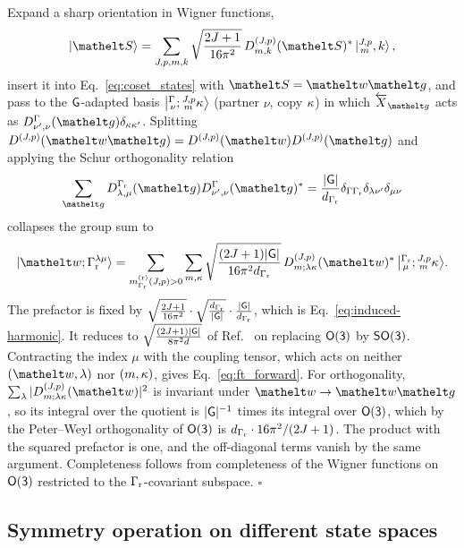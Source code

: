 Expand a sharp orientation in Wigner functions, $$\ket{\orient}=\sum_{J,\parity,m,k}\sqrt{\frac{2J+1}{16\pi^2}}\,\irrJp{J}{\parity}_{m,k}(\orient)^*\ket{{}^{J,\parity}_{\,m},k},$$ insert it into Eq.~\eqref{eq:coset_states} with $\orient=\crep\gel$, and pass to the $\mathsf{G}$-adapted basis $\bigl\lvert{}^{\Gamma}_{\,\nu};{}^{J,p}_{\,m}\kappa\bigr\rangle$ (partner $\nu$, copy $\kappa$) in which $\cev X_{\gel}$ acts as $D^{\Gamma}_{\nu',\nu}(\gel)\delta_{\mult\mult'}$. Splitting $\irrJp{J}{\parity}(\crep\gel)=\irrJp{J}{\parity}(\crep)\irrJp{J}{\parity}(\gel)$ and applying the Schur orthogonality relation $$\sum_{\gel} D^{\Grot}_{\lambda,\mu}(\gel)D^{\Gamma}_{\nu',\nu}(\gel)^{*}=\frac{|\grp{G}|}{d_{\Grot}}\delta_{\Gamma\Grot}\delta_{\lambda\nu'}\delta_{\mu\nu}$$ collapses the group sum to
\begin{equation}
\ket{\crep;\Grot^{\lambda\mu}}=\sum_{m^{(\mathrm r)}_{\Grot}(J,\parity)>0}\sum_{m,\mult}\sqrt{\frac{(2J+1)|\grp{G}|}{16\pi^2 d_{\Grot}}}\,\irrJp{J}{\parity}_{m;\lambda\mult}(\crep)^*\,\cgket{\Grot}{\mu}{{}^{J,\parity}_{\,m}\mult}.
\end{equation}
The prefactor is fixed by $\sqrt{\frac{2J+1}{16\pi^2}}\cdot\sqrt{\frac{d_{\Gamma_{\mathrm{r}}}}{|\mathsf{G}|}}\cdot\frac{|\mathsf{G}|}{d_{\Gamma_{\mathrm{r}}}}$, which is Eq.~\eqref{eq:induced-harmonic}. It reduces to $\sqrt{\frac{(2J+1)|\mathsf{G}|}{8\pi^2 d}}$ of Ref.~\cite{albert2025quantumtheorymolecularorientations} on replacing $\mathsf{O(3)}$ by $\mathsf{SO(3)}$. Contracting the index $\mu$ with the coupling tensor, which acts on neither $(\crep,\lambda)$ nor $(m,\kappa)$, gives Eq.~\eqref{eq:ft_forward}. For orthogonality, $\sum_\lambda|\irrJp{J}{\parity}_{m;\lambda\mult}(\crep)|^2$ is invariant under $\crep\to{\crep}\gel$, so its integral over the quotient is $|\mathsf{G}|^{-1}$ times its integral over $\mathsf{O(3)}$, which by the Peter--Weyl orthogonality of $\mathsf{O(3)}$ is $d_{\Gamma_{\mathrm{r}}}\cdot16\pi^2/(2J+1)$. The product with the squared prefactor is one, and the off-diagonal terms vanish by the same argument. Completeness follows from completeness of the Wigner functions on $\mathsf{O(3)}$ restricted to the $\Gamma_{\mathrm{r}}$-covariant subspace. \hfill$\square$





\subsection{Symmetry operation on different state spaces}
\label{subsec:tour}


